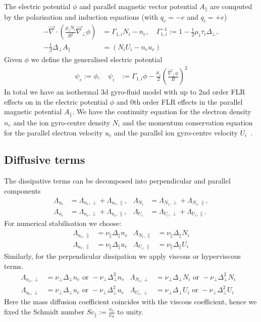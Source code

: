 The electric potential \(\phi\) and parallel magnetic vector potential \(A_\parallel\) are
computed by the polarisation and induction equations (with $q_e=-e$ and $q_i=+e$)
\begin{align}
 -\vec{\nabla} \cdot\left(\frac{\mu_iN_i}{B^2} \vec{\nabla}_\perp \phi\right) &=  \Gamma_{1,i} N_i -n_e, \quad \Gamma_{1,i}^{-1} := 1-\frac{1}{2}\mu_i\tau_i\Delta_\perp , \\
  -\frac{1}{\beta} \Delta_\perp A_\parallel &= \left(N_i U_i-n_e u_e \right)
  \label{eq:polarisation_dimensional}
\end{align}
Given $\phi$ we define the generalised electric potential
\begin{align}
    \psi_e := \phi,\quad \psi_i&:= \Gamma_{1,i} \phi - \frac{\mu_i }{2}\left(\frac{\vec \nabla_\perp\phi}{B}\right)^2
\end{align}
In total 
we have an isothermal 3d gyro-fluid model with up to 2nd order FLR effects
on in the electric potential $\phi$ and 0th order FLR effects in the parallel magnetic
potential $A_\parallel$.
We have the continuity equation for the electron density \(n_e\) and the ion gyro-centre
density \(N_i\) and the momentum conservation equation for
the parallel electron velocity \(u_e\) and the parallel ion gyro-centre velocity \(U_i\)~\cite{WiesenbergerPhD, HeldPhD}.

\subsection{Diffusive terms}\label{sec:dissres}
The dissipative terms can be decomposed into perpendicular and parallel components
\begin{align}
 \Lambda_{n_e} &= \Lambda_{n_e,\perp}+\Lambda_{n_e,\parallel}, &
 \Lambda_{N_i} &= \Lambda_{N_i,\perp}+\Lambda_{N_i,\parallel},\\
 \Lambda_{u_e} &= \Lambda_{u_e,\perp}+\Lambda_{u_e,\parallel},&
 \Lambda_{U_i} &= \Lambda_{U_i,\perp}+\Lambda_{U_i,\parallel}.
\end{align}
For numerical stabilisation we choose:
\begin{align}
\Lambda_{n_e,\parallel} &= \nu_\parallel \Delta_\parallel n_e &
\Lambda_{N_i,\parallel} &= \nu_\parallel \Delta_\parallel N_i \\
\Lambda_{u_e,\parallel} &= \nu_\parallel \Delta_\parallel u_e &
\Lambda_{U_i,\parallel} &= \nu_\parallel \Delta_\parallel U_i 
\end{align}
Similarly, for the perpendicular dissipation we apply viscous or hyperviscous terms.
\begin{align}\label{eq:perpdiffNT}
 \Lambda_{n_e,\perp} &=  \nu_\perp \Delta_\perp n_e \text{ or } -\nu_\perp \Delta_\perp^2 n_e&
 \Lambda_{N_i,\perp} &=  \nu_\perp \Delta_\perp N_i \text{ or } -\nu_\perp \Delta_\perp^2 N_i & \\
 \Lambda_{u_e,\perp} &=  \nu_\perp \Delta_\perp u_e \text{ or } -\nu_\perp \Delta_\perp^2 u_e &
 \Lambda_{U_i,\perp} &=  \nu_\perp \Delta_\perp U_i \text{ or } -\nu_\perp \Delta_\perp^2 U_i
\end{align}
Here the mass diffusion coefficient coincides with the viscous coefficient, hence we fixed the Schmidt number \(\mathit{Sc}_\parallel:= \frac{\nu_U}{\nu_N}\) to unity.

